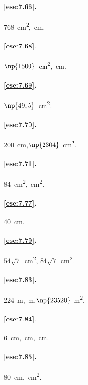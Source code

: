 \paragraph{\ref{ese:7.66}.}
768~cm\textsuperscript{2},~cm.

\paragraph{\ref{ese:7.68}.}
$\np{1500}$~cm\textsuperscript{2},~cm.

\paragraph{\ref{ese:7.69}.}
$\np{49,5}$~cm\textsuperscript{2}.

\paragraph{\ref{ese:7.70}.}
200~cm,\quad $\np{2304}$~cm\textsuperscript{2}.

\paragraph{\ref{ese:7.71}.}
84~cm\textsuperscript{2},~cm\textsuperscript{2}.

\paragraph{\ref{ese:7.77}.}
40~cm.

\paragraph{\ref{ese:7.79}.}
$54\sqrt{7}$~cm\textsuperscript{2},\quad 
$84\sqrt{7}$~cm\textsuperscript{2}.

\paragraph{\ref{ese:7.83}.}
224~m,~m,\quad $\np{23520}$~m\textsuperscript{2}.

\paragraph{\ref{ese:7.84}.}
6~cm,~cm,~cm.

\paragraph{\ref{ese:7.85}.}
80~cm,~cm\textsuperscript{2}.

